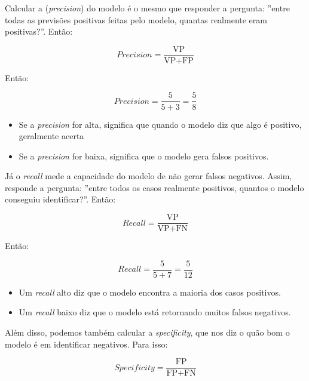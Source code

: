 \documentclass{article}
\begin{document}
Calcular a (\textit{precision}) do modelo é o mesmo que responder
a pergunta: ''entre todas as previsões positivas feitas pelo modelo, 
quantas realmente eram positivas?''. Então:

\begin{equation}
    \textit{Precision} = \frac{\text{VP}}{\text{VP} + \text{FP}}
\end{equation}

Então:

\begin{equation*}
    \textit{Precision} = \frac{5}{5 + 3} = \frac{5}{8}
\end{equation*}

\begin{itemize}
    \item Se a \textit{precision} for alta, significa que quando o modelo diz
    que algo é positivo, geralmente acerta
    \item Se a \textit{precision} for baixa, significa que o modelo gera falsos
    positivos.
\end{itemize}

Já o \textit{recall} mede a capacidade do modelo de não gerar falsos 
negativos. Assim, responde a pergunta: ''entre todos os casos realmente 
positivos, quantos o modelo conseguiu identificar?''. Então:

\begin{equation}
    \textit{Recall} = \frac{\text{VP}}{\text{VP} + \text{FN}}
\end{equation}

Então:

\begin{equation*}
    \textit{Recall} = \frac{5}{5 + 7} = \frac{5}{12}
\end{equation*}

\begin{itemize}
    \item Um \textit{recall} alto diz que o modelo encontra a maioria 
    dos casos positivos. 
    \item Um \textit{recall} baixo diz que o modelo está retornando 
    muitos falsos negativos.
\end{itemize}

Além disso, podemos também calcular a \textit{specificity}, que nos diz 
o quão bom o modelo é em identificar negativos. Para isso:

\begin{equation}
    \textit{Specificity} = \frac{\text{FP}}{\text{FP} + \text{FN}}
\end{equation}
\end{document}
